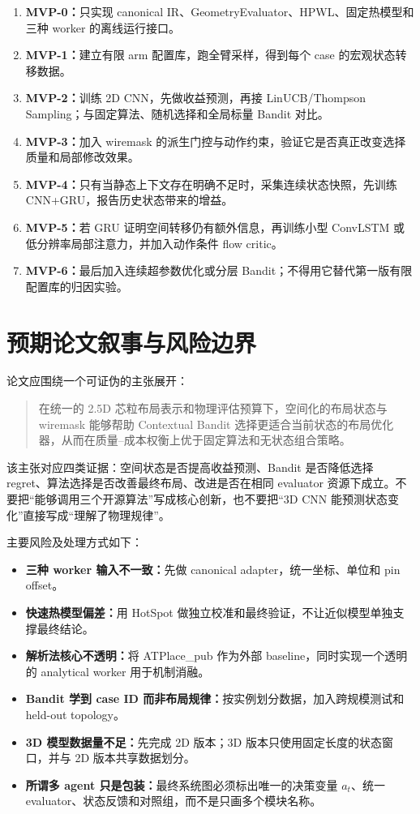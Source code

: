 \documentclass[UTF8,a4paper,11pt]{ctexart}
\begin{document}
\begin{enumerate}
    \item \textbf{MVP-0：}只实现 canonical IR、GeometryEvaluator、HPWL、固定热模型和三种 worker 的离线运行接口。
    \item \textbf{MVP-1：}建立有限 arm 配置库，跑全臂采样，得到每个 case 的宏观状态转移数据。
    \item \textbf{MVP-2：}训练 2D CNN，先做收益预测，再接 LinUCB/Thompson Sampling；与固定算法、随机选择和全局标量 Bandit 对比。
    \item \textbf{MVP-3：}加入 wiremask 的派生门控与动作约束，验证它是否真正改变选择质量和局部修改效果。
    \item \textbf{MVP-4：}只有当静态上下文存在明确不足时，采集连续状态快照，先训练 CNN+GRU，报告历史状态带来的增益。
    \item \textbf{MVP-5：}若 GRU 证明空间转移仍有额外信息，再训练小型 ConvLSTM 或低分辨率局部注意力，并加入动作条件 flow critic。
    \item \textbf{MVP-6：}最后加入连续超参数优化或分层 Bandit；不得用它替代第一版有限配置库的归因实验。
\end{enumerate}

\section{预期论文叙事与风险边界}

论文应围绕一个可证伪的主张展开：

\begin{quote}
在统一的 2.5D 芯粒布局表示和物理评估预算下，空间化的布局状态与 wiremask 能够帮助 Contextual Bandit 选择更适合当前状态的布局优化器，从而在质量--成本权衡上优于固定算法和无状态组合策略。
\end{quote}

该主张对应四类证据：空间状态是否提高收益预测、Bandit 是否降低选择 regret、算法选择是否改善最终布局、改进是否在相同 evaluator 资源下成立。不要把“能够调用三个开源算法”写成核心创新，也不要把“3D CNN 能预测状态变化”直接写成“理解了物理规律”。

主要风险及处理方式如下：

\begin{itemize}
    \item \textbf{三种 worker 输入不一致：}先做 canonical adapter，统一坐标、单位和 pin offset。
    \item \textbf{快速热模型偏差：}用 HotSpot 做独立校准和最终验证，不让近似模型单独支撑最终结论。
    \item \textbf{解析法核心不透明：}将 ATPlace\_pub 作为外部 baseline，同时实现一个透明的 analytical worker 用于机制消融。
    \item \textbf{Bandit 学到 case ID 而非布局规律：}按实例划分数据，加入跨规模测试和 held-out topology。
    \item \textbf{3D 模型数据量不足：}先完成 2D 版本；3D 版本只使用固定长度的状态窗口，并与 2D 版本共享数据划分。
    \item \textbf{所谓多 agent 只是包装：}最终系统图必须标出唯一的决策变量 \(a_t\)、统一 evaluator、状态反馈和对照组，而不是只画多个模块名称。
\end{itemize}
\end{document}
